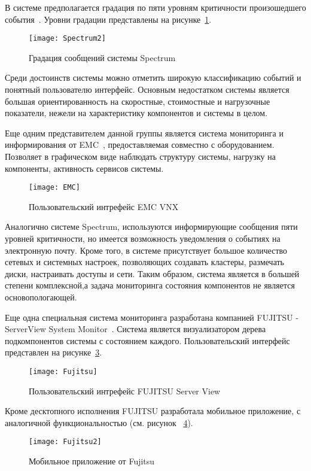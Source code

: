 В системе предполагается градация по пяти уровням критичности произошедшего события~\cite{Spectrum}. Уровни градации представлены на рисунке~\ref{fig:Spectrum2}.
\begin{figure}[!h]
	\centering
	\texttt{[image: Spectrum2]}
	\caption{Градация сообщений системы Spectrum}
	\label{fig:Spectrum2}
\end{figure}
Среди достоинств системы можно отметить широкую классификацию событий и понятный пользователю интерфейс. Основным недостатком системы является большая ориентированность на скоростные, стоимостные и нагрузочные показатели, нежели на характеристику компонентов и системы в целом. 

Еще одним представителем данной группы является система мониторинга и информирования от EMC~\cite{EMC}, предоставляемая совместно с оборудованием. Позволяет в графическом виде наблюдать структуру системы, нагрузку на компоненты, активность сервисов системы. 
\begin{figure}[!h]
	\centering
	\texttt{[image: EMC]}
	\caption{Пользовательский интрефейс EMC VNX}
	\label{fig:EMC}
\end{figure}
Аналогично системе Spectrum, используются информирующие сообщения пяти уровней критичности, но имеется возможность уведомления о событиях на электронную почту. Кроме того, в системе присутствует большое количество сетевых и системных настроек, позволяющих создавать кластеры, размечать диски, настраивать доступы и сети. Таким образом, система является в большей степени комплексной,а задача мониторинга состояния компонентов не является основопологающей. 

Еще одна специальная система мониторинга разработана компанией FUJITSU - ServerView System Monitor~\cite{Fujitsu}. Система является визуализатором дерева подкомпонентов системы с состоянием каждого. Пользовательский интерфейс представлен на рисунке~\ref{fig:Fujitsu}.  
\begin{figure}[!h]
	\centering
	\texttt{[image: Fujitsu]}
	\caption{Пользовательский интрефейс FUJITSU Server View}
	\label{fig:Fujitsu}
\end{figure}
Кроме десктопного исполнения FUJITSU разработала мобильное приложение, с аналогичной функциональностью (см. рисунок ~\ref{fig:Fujitsu2}).
\begin{figure}[!h]
	\centering
	\texttt{[image: Fujitsu2]}
	\caption{Мобильное приложение от Fujitsu}
	\label{fig:Fujitsu2}
\end{figure}

